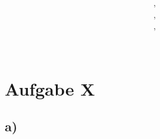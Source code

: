\documentclass[12pt]{scrartcl}
\title{
	\Huge{\workSheetNr} \\
	\Large{\courseFull}
}
\author{
	\textbf{\memberA}, \memberAMail \\
	\textbf{\memberB}, \memberBMail \\
	\textbf{\memberC}, \memberCMail \\ \\
}
\date{\dateOfFinishing}
\begin{document}
	
	\maketitle
	\newpage
	
	\section*{Aufgabe X}
	\subsection*{a)}
	
\end{document}
